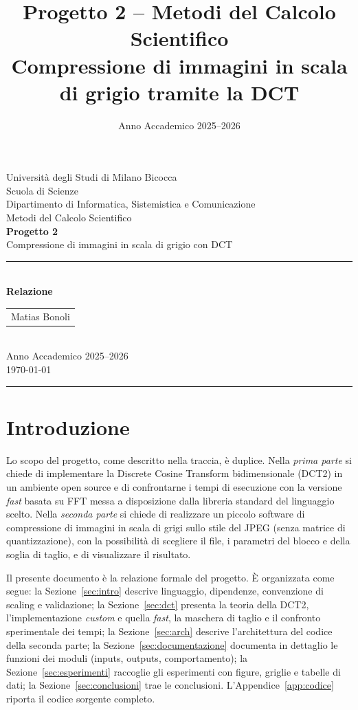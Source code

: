 \documentclass[11pt,a4paper]{article}
\title{\Large \textbf{Progetto 2 -- Metodi del Calcolo Scientifico}\\[2pt]
\large Compressione di immagini in scala di grigio tramite la DCT}
\author{}
\date{Anno Accademico 2025--2026}
\begin{document}
\begin{titlepage}
\centering
\vspace*{2.5cm}
{\large Università degli Studi di Milano Bicocca\\
Scuola di Scienze\\
Dipartimento di Informatica, Sistemistica e Comunicazione}\\[0.4cm]
{\large Metodi del Calcolo Scientifico}\\[1.6cm]
{\huge\bfseries Progetto 2}\\[0.5cm]
{\Large Compressione di immagini in scala di grigio con DCT}\\[2.5cm]
\rule{10cm}{0.4pt}\\[0.6cm]
{\large\bfseries Relazione}\\[2.2cm]
\begin{tabular}{c}
Matias Bonoli\\[0.2cm]
\end{tabular}\\[2.8cm]
{\large Anno Accademico 2025--2026}\\[0.3cm]
{\large \today}
\vfill
\end{titlepage}

\tableofcontents
\vspace{1cm}
\hrule
\vspace{0.4cm}

\section{Introduzione}

Lo scopo del progetto, come descritto nella traccia, è duplice.
Nella \emph{prima parte} si chiede di implementare la Discrete Cosine
Transform bidimensionale (DCT2) in un ambiente open source e di confrontarne i
tempi di esecuzione con la versione \emph{fast} basata su FFT messa a
disposizione dalla libreria standard del linguaggio scelto.
Nella \emph{seconda parte} si chiede di realizzare un piccolo software di
compressione di immagini in scala di grigi sullo stile del JPEG (senza matrice
di quantizzazione), con la possibilità di scegliere il file, i parametri del
blocco e della soglia di taglio, e di visualizzare il risultato.

Il presente documento è la relazione formale del progetto. È organizzata come
segue: la Sezione~\ref{sec:intro} descrive linguaggio, dipendenze, convenzione di
scaling e validazione; la Sezione~\ref{sec:dct} presenta la teoria della DCT2,
l'implementazione \emph{custom} e quella \emph{fast}, la maschera di taglio e
il confronto sperimentale dei tempi; la Sezione~\ref{sec:arch} descrive
l'architettura del codice della seconda parte; la
Sezione~\ref{sec:documentazione} documenta in dettaglio le funzioni dei moduli
(inputs, outputs, comportamento); la Sezione~\ref{sec:esperimenti} raccoglie gli
esperimenti con figure, griglie e tabelle di dati; la
Sezione~\ref{sec:conclusioni} trae le conclusioni. L'Appendice~\ref{app:codice}
riporta il codice sorgente completo.
\end{document}
